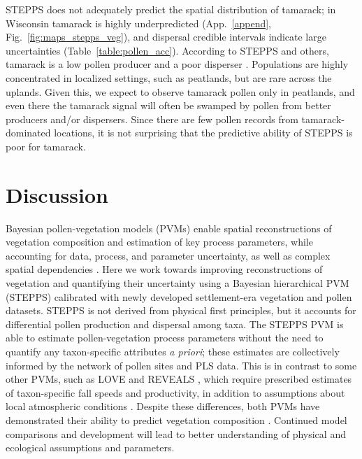 \documentclass[12pt]{article}
\begin{document}
STEPPS does not adequately predict the spatial distribution of
tamarack; in Wisconsin tamarack is highly underpredicted
(App.~\ref{append}, Fig.~\ref{fig:maps_stepps_veg}), and dispersal
credible intervals indicate large uncertainties
(Table~\ref{table:pollen_acc}). According to STEPPS and others,
tamarack is a low pollen producer and a poor disperser
\citep{janssen1966recent}. Populations are highly concentrated in
localized settings, such as peatlands, but are rare across the
uplands. Given this, we expect to observe tamarack pollen only in
peatlands, and even there the tamarack signal will often be swamped by
pollen from better producers and/or dispersers. Since there are few
pollen records from tamarack-dominated locations, it is not surprising
that the predictive ability of STEPPS is poor for tamarack.

\section{Discussion}

Bayesian pollen-vegetation models (PVMs) enable spatial
reconstructions of vegetation composition and estimation of key
process parameters, while accounting for data, process, and parameter
uncertainty, as well as complex spatial dependencies
\citep{paciorek2009mapping}. Here we work towards improving
reconstructions of vegetation and quantifying their uncertainty using
a Bayesian hierarchical PVM (STEPPS) calibrated with newly developed
settlement-era vegetation and pollen datasets. STEPPS is not derived
from physical first principles, but it accounts for differential
pollen production and dispersal among taxa. The STEPPS PVM is able to
estimate pollen-vegetation process parameters without the need to
quantify any taxon-specific attributes \textit{a priori}; these
estimates are collectively informed by the network of pollen sites and
PLS data. This is in contrast to some other PVMs, such as LOVE and
REVEALS \citep{sugita2007theory1, sugita2007theory2}, which require
prescribed estimates of taxon-specific fall speeds and productivity,
in addition to assumptions about local atmospheric conditions
\citep{jackson1999pollen}. Despite these differences, both PVMs have
demonstrated their ability to predict vegetation composition
\citep{soepboer2010regional,wang2011reassessment,
  overballe2013quantitative}. Continued model comparisons and
development will lead to better understanding of physical and
ecological assumptions and parameters.
\end{document}
